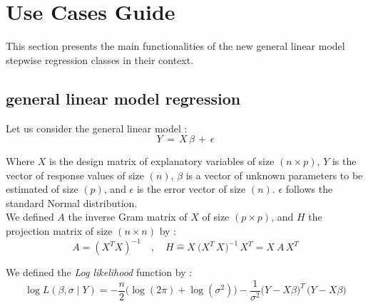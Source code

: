%

\section{Use Cases Guide}

This section presents the main functionalities of the new general linear model stepwise regression classes in their context.\\

\subsection{general linear model regression}

Let us consider the general linear model : 
\begin{equation}
\boxed{
Y \,=\, X \,\beta\, +\, \epsilon }
\end{equation}


Where $X$ is the design matrix of explanatory variables of size $(n \times p)$,
$Y$ is the vector of response values of size $(n)$, 
$\beta $ is a vector of unknown parameters to be estimated of size $(p)$, 
and $\epsilon $ is the error vector of size $(n)$. $\epsilon$ follows the standard Normal distribution.\\
We defined $A$ the inverse Gram matrix of $X$ of size $(p\times p)$, 
and $H$ the projection matrix of size $(n\times n)$ by :
\begin{equation}
A \hat{=}(X^T X)^{-1}  \quad,\quad 
H \hat{=} X_{}\,\big(X^T_{} \,X_{}\big)^{-1} \,X^T_{}  =  X_{}\,A \,X^T_{}
 \end{equation}

We defined the {\it Log likelihood} function by : 
\begin{equation}
\log L(\beta,\sigma\mid Y)= -\frac{n}{2}\big(\log(2\pi)+ \log(\sigma^2)\big)- \frac{1}{\sigma^2}\big(Y-X\beta\big)^T\,\big(Y-X\beta\big)
\end{equation}

